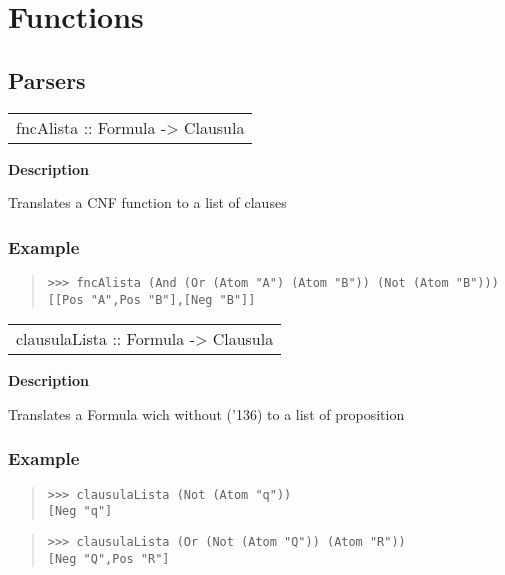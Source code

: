 \section{Functions}
\subsection{Parsers}
\begin{haddockdesc}
\item[\begin{tabular}{@{}l}
fncAlista :: Formula -> {\char 91}Clausula{\char 93}
\end{tabular}]
{\haddockbegindoc
\textbf{Description}\par
Translates a CNF function to a list of clauses\par
\subsubsection*{\textbf{Example}}
\begin{quote}
{\haddockverb\begin{verbatim}
>>> fncAlista (And (Or (Atom "A") (Atom "B")) (Not (Atom "B")))
[[Pos "A",Pos "B"],[Neg "B"]]

\end{verbatim}}
\end{quote}}
\end{haddockdesc}
\begin{haddockdesc}
\item[\begin{tabular}{@{}l}
clausulaLista :: Formula -> Clausula
\end{tabular}]
{\haddockbegindoc
\textbf{Description}\par
Translates a Formula wich without ({\char '136}) to a list of proposition\par
\subsubsection*{\textbf{Example}}
\begin{quote}
{\haddockverb\begin{verbatim}
>>> clausulaLista (Not (Atom "q"))
[Neg "q"]

\end{verbatim}}
\end{quote}
\begin{quote}
{\haddockverb\begin{verbatim}
>>> clausulaLista (Or (Not (Atom "Q")) (Atom "R"))
[Neg "Q",Pos "R"]

\end{verbatim}}
\end{quote}}
\end{haddockdesc}
